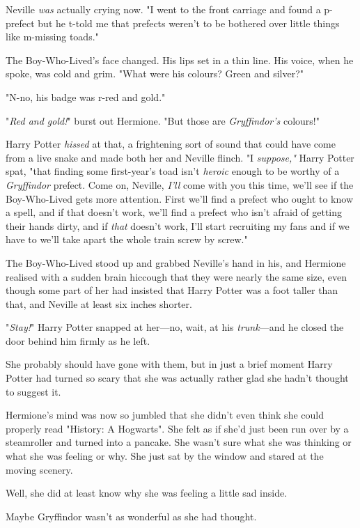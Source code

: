 Neville \emph{was} actually crying now. "I went to the front carriage and found 
a p-prefect but he t-told me that prefects weren't to be bothered over little 
things like m-missing toads."

The Boy-Who-Lived's face changed. His lips set in a thin line. His voice, when 
he spoke, was cold and grim. "What were his colours? Green and silver?"

"N-no, his badge was r-red and gold."

"\emph{Red and gold!}" burst out Hermione. "But those are \emph{Gryffindor's} 
colours!"

Harry Potter \emph{hissed} at that, a frightening sort of sound that could have 
come from a live snake and made both her and Neville flinch. "I 
\emph{suppose,"} Harry Potter spat, "that finding some first-year's toad isn't 
\emph{heroic} enough to be worthy of a \emph{Gryffindor} prefect. Come on, 
Neville, \emph{I'll} come with you this time, we'll see if the Boy-Who-Lived 
gets more attention. First we'll find a prefect who ought to know a spell, and 
if that doesn't work, we'll find a prefect who isn't afraid of getting their 
hands dirty, and if \emph{that} doesn't work, I'll start recruiting my fans and 
if we have to we'll take apart the whole train screw by screw."

The Boy-Who-Lived stood up and grabbed Neville's hand in his, and Hermione 
realised with a sudden brain hiccough that they were nearly the same size, even 
though some part of her had insisted that Harry Potter was a foot taller than 
that, and Neville at least six inches shorter.

"\emph{Stay!}" Harry Potter snapped at her---no, wait, at his 
\emph{trunk}---and he closed the door behind him firmly as he left.

She probably should have gone with them, but in just a brief moment Harry 
Potter had turned so scary that she was actually rather glad she hadn't thought 
to suggest it.

Hermione's mind was now so jumbled that she didn't even think she could 
properly read "History: A Hogwarts". She felt as if she'd just been run over by 
a steamroller and turned into a pancake. She wasn't sure what she was thinking 
or what she was feeling or why. She just sat by the window and stared at the 
moving scenery.

Well, she did at least know why she was feeling a little sad inside.

Maybe Gryffindor wasn't as wonderful as she had thought.
